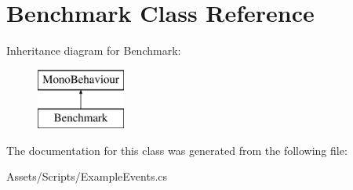\hypertarget{class_benchmark}{}\section{Benchmark Class Reference}
\label{class_benchmark}
Inheritance diagram for Benchmark\+:\begin{figure}[H]
\begin{center}
\leavevmode
\includegraphics[height=2.000000cm]{class_benchmark}
\end{center}
\end{figure}


The documentation for this class was generated from the following file\+:\begin{DoxyCompactItemize}
\item 
Assets/\+Scripts/Example\+Events.\+cs\end{DoxyCompactItemize}
